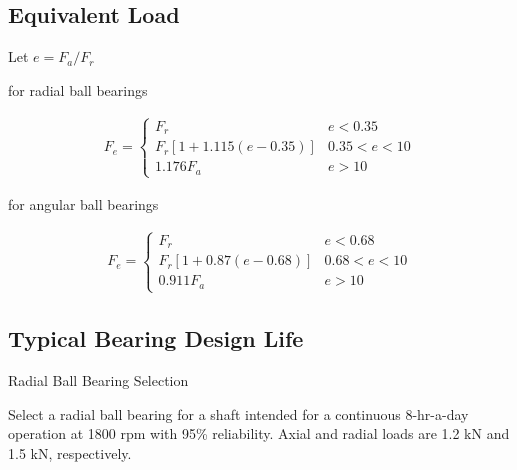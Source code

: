 \documentclass[
10pt,
a4paper,
openany,
svgnames,
]{book}
\begin{document}
\subsection*{Equivalent Load}
\label{sec:org6e4ada8}

Let \(e = F_a / F_r\)

for radial ball bearings

\begin{align*}
    F_e = \left\{
    \begin{array}{ll}
        F_r & e < 0.35 \\
        F_r \left[ 1 + 1.115(e - 0.35) \right] & 0.35 < e < 10 \\
        1.176 F_a & e > 10
    \end{array}
    \right.
\end{align*}

for angular ball bearings

\begin{align*}
    F_e = \left\{
    \begin{array}{ll}
        F_r & e < 0.68 \\
        F_r \left[ 1 + 0.87(e - 0.68) \right] & 0.68 < e < 10 \\
        0.911 F_a & e > 10
    \end{array}
    \right.
\end{align*}

\subsection*{Typical Bearing Design Life}
\label{sec:org412d1a6}

\begin{center}
\end{center}

\begin{example} Radial Ball Bearing Selection
\label{sec:org7e80c97}

Select a radial ball bearing for a shaft intended for a continuous 8-hr-a-day operation at 1800 rpm with 95\% reliability. Axial and radial loads are 1.2 kN and 1.5 kN, respectively.

\end{example}
\end{document}
